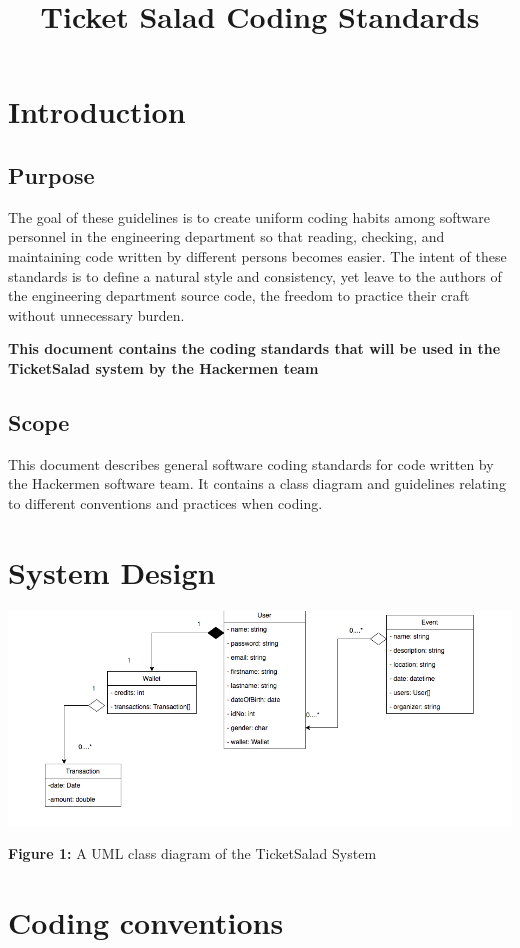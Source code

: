 \documentclass[11pt]{article}
\begin{document}
	\title{Ticket Salad Coding Standards}
	\date{}
	\maketitle
	\tableofcontents
	\newpage
	
	\section{Introduction}
	\subsection{Purpose}
	The goal of these guidelines is to create uniform coding habits among software personnel in the
	engineering department so that reading, checking, and maintaining code written by different persons
	becomes easier. The intent of these standards is to define a natural style and consistency, yet leave
	to the authors of the engineering department source code, the freedom to practice their craft without
	unnecessary burden.
	
	
	\textbf{This document contains the coding standards that will be used in the TicketSalad system by the Hackermen team}
	\subsection{Scope}
	This document describes general software coding standards for code written by the Hackermen software team. It contains a class diagram and guidelines relating to different conventions and practices when coding.
	\section{System Design}
	\includegraphics[scale=0.5]{Domain.png}
	\caption{\textbf{Figure 1:} A UML class diagram of the TicketSalad System}
	\section{Coding conventions}
\end{document}

